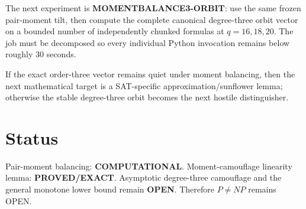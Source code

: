 \documentclass[11pt]{article}
\begin{document}
The next experiment is \textbf{MOMENTBALANCE3-ORBIT}: use the same frozen
pair-moment tilt, then compute the complete canonical degree-three orbit vector
on a bounded number of independently chunked formulas at \(q=16,18,20\).
The job must be decomposed so every individual Python invocation remains below
roughly 30 seconds.

If the exact order-three vector remains quiet under moment balancing, then the
next mathematical target is a SAT-specific approximation/sunflower lemma;
otherwise the stable degree-three orbit becomes the next hostile distinguisher.

\section{Status}

Pair-moment balancing: \textbf{COMPUTATIONAL}.  Moment-camouflage linearity
lemma: \textbf{PROVED/EXACT}.  Asymptotic degree-three camouflage and the
general monotone lower bound remain \textbf{OPEN}.  Therefore \(P\ne NP\)
remains OPEN.
\end{document}
